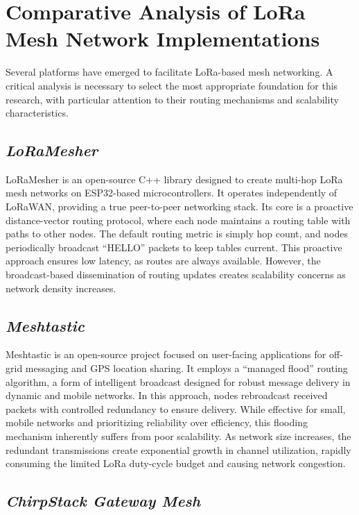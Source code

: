 \section{Comparative Analysis of LoRa Mesh Network Implementations}

Several platforms have emerged to facilitate LoRa-based mesh networking. A critical analysis is necessary to select the most appropriate foundation for this research, with particular attention to their routing mechanisms and scalability characteristics.

\subsection{\textit{LoRaMesher}}

LoRaMesher is an open-source C++ library designed to create multi-hop LoRa mesh networks on ESP32-based microcontrollers. It operates independently of LoRaWAN, providing a true peer-to-peer networking stack. Its core is a proactive distance-vector routing protocol, where each node maintains a routing table with paths to other nodes. The default routing metric is simply hop count, and nodes periodically broadcast ``HELLO'' packets to keep tables current. This proactive approach ensures low latency, as routes are always available. However, the broadcast-based dissemination of routing updates creates scalability concerns as network density increases.

\subsection{\textit{Meshtastic}}

Meshtastic is an open-source project focused on user-facing applications for off-grid messaging and GPS location sharing. It employs a ``managed flood'' routing algorithm, a form of intelligent broadcast designed for robust message delivery in dynamic and mobile networks. In this approach, nodes rebroadcast received packets with controlled redundancy to ensure delivery. While effective for small, mobile networks and prioritizing reliability over efficiency, this flooding mechanism inherently suffers from poor scalability. As network size increases, the redundant transmissions create exponential growth in channel utilization, rapidly consuming the limited LoRa duty-cycle budget and causing network congestion.

\subsection{\textit{ChirpStack Gateway Mesh}}

